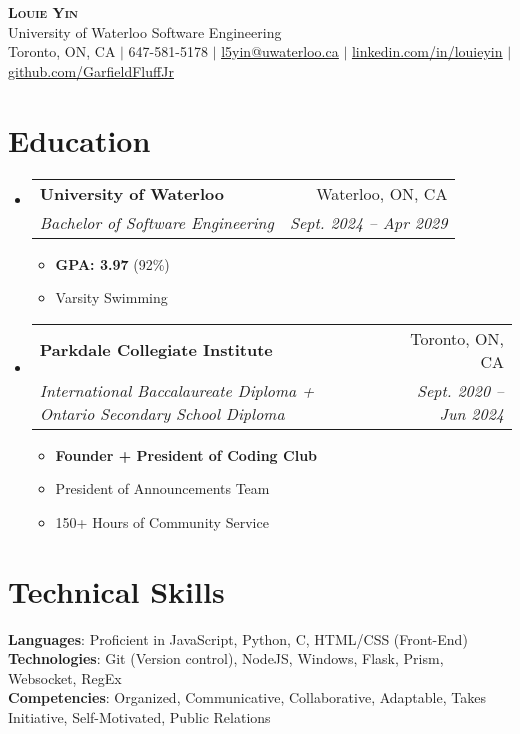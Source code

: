 \documentclass[letterpaper,11pt]{article}
\makeatletter
\newcommand{\resumeItem}[1]{
  \item\small{
    {#1 \vspace{-2pt}}
  }
}
\newcommand{\resumeSubheading}[4]{
  \vspace{-2pt}\item
    \begin{tabular*}{0.97\textwidth}[t]{l@{\extracolsep{\fill}}r}
      \textbf{#1} & #2 \\
      \textit{\small#3} & \textit{\small #4} \\
    \end{tabular*}\vspace{-7pt}
}
\newcommand{\resumeSubHeadingListStart}{\begin{itemize}[leftmargin=0.15in, label={}]}
\newcommand{\resumeSubHeadingListEnd}{\end{itemize}}
\newcommand{\resumeItemListStart}{\begin{itemize}}
\newcommand{\resumeItemListEnd}{\end{itemize}\vspace{-8pt}}
\makeatother
\begin{document}

\begin{center}
    \textbf{\Huge \scshape Louie Yin} \\
    \Large University of Waterloo Software Engineering \\ \vspace{3pt}
    \small Toronto, ON, CA $|$
    \small 647-581-5178 $|$ \href{mailto:l5yin@uwaterloo.ca}{\underline{l5yin@uwaterloo.ca}} $|$ 
    \href{https://www.linkedin.com/in/louieyin/}{\underline{linkedin.com/in/louieyin}} $|$
    \href{https://github.com/GarfieldFluffJr}{\underline{github.com/GarfieldFluffJr}}
\end{center}


\section{Education}
  \resumeSubHeadingListStart
    \resumeSubheading
      {University of Waterloo}{Waterloo, ON, CA}
      {Bachelor of Software Engineering}{Sept. 2024 -- Apr 2029}
      \resumeItemListStart
        \resumeItem{\textbf{GPA: 3.97} (92\%)}
        \resumeItem{Varsity Swimming}
      \resumeItemListEnd
    \resumeSubheading
      {Parkdale Collegiate Institute}{Toronto, ON, CA}
      {International Baccalaureate Diploma + Ontario Secondary School Diploma}{Sept. 2020 -- Jun 2024}
    \resumeItemListStart
      \resumeItem{\textbf{Founder + President of Coding Club}}
      \resumeItem{President of Announcements Team}
      \resumeItem{150+ Hours of Community Service}
    \resumeItemListEnd
  \resumeSubHeadingListEnd


\section{Technical Skills}
 \begin{itemize}[leftmargin=0.15in, label={}]
    \small{\item{
     \textbf{Languages}{: Proficient in JavaScript, Python, C, HTML/CSS (Front-End)} \\
     \textbf{Technologies}{: Git (Version control), NodeJS, Windows, Flask, Prism, Websocket, RegEx} \\
     \textbf{Competencies}{: Organized, Communicative, Collaborative, Adaptable, Takes Initiative, Self-Motivated, Public Relations}
    }}
 \end{itemize}
\end{document}
